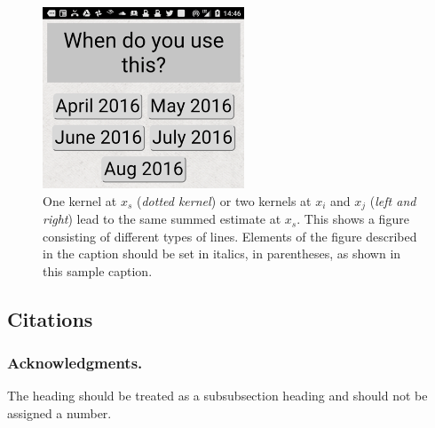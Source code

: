 \documentclass[runningheads,a4paper]{llncs}
\begin{document}
\begin{figure}
\centering
\includegraphics[width=6cm,bb=0 0 429 386]{figures/429eec261024dc6c85351f51c12f09b4.png}
\caption{One kernel at $x_s$ (\emph{dotted kernel}) or two kernels at
$x_i$ and $x_j$ (\textit{left and right}) lead to the same summed estimate
at $x_s$. This shows a figure consisting of different types of
lines. Elements of the figure described in the caption should be set in
italics, in parentheses, as shown in this sample caption.}
\label{fig:example}
\end{figure}

\subsection{Citations}

\subsubsection*{Acknowledgments.} The heading should be treated as a
subsubsection heading and should not be assigned a number.




\end{document}

